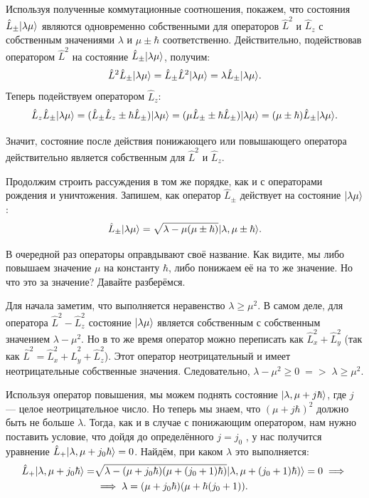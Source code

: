 Используя полученные коммутационные соотношения, покажем, что состояния
$\hat{L}_{\pm}\lvert\lambda\mu\rangle$ являются одновременно собственными для
операторов $\hat{L}^2$ и $\hat{L}_z$ с собственным значениями $\lambda$ и $\mu
  \pm \hbar$ соответственно. Действительно, подействовав оператором $\hat{L}^2$
на состояние $\hat{L}_{\pm}\lvert\lambda\mu\rangle$, получим:
\[
  \hat{L}^2\hat{L}_{\pm}\lvert\lambda\mu\rangle = \hat{L}_{\pm}\hat{L}^2\lvert\lambda\mu\rangle = \lambda\hat{L}_{\pm}\lvert\lambda\mu\rangle.
\]
Теперь подействуем оператором $\hat{L}_z$:
\[
  \hat{L}_z\hat{L}_{\pm}\lvert\lambda\mu\rangle = (\hat{L}_{\pm}\hat{L}_z \pm \hbar\hat{L}_{\pm})\lvert\lambda\mu\rangle = (\mu\hat{L}_{\pm} \pm \hbar\hat{L}_{\pm})\lvert\lambda\mu\rangle = (\mu \pm \hbar)\hat{L}_{\pm}\lvert\lambda\mu\rangle.
\]

Значит, состояние после действия понижающего или повышающего оператора
действительно является собственным для $\hat{L}^2$ и $\hat{L}_z$.

Продолжим строить рассуждения в том же порядке, как и с операторами рождения и
уничтожения. Запишем, как оператор $\hat{L}_{\pm}$ действует на состояние
$\lvert\lambda\mu\rangle$:
\[
  \hat{L}_{\pm}\lvert\lambda\mu\rangle = \sqrt{\lambda - \mu(\mu \pm \hbar)}\lvert\lambda,\mu\pm\hbar\rangle.
\]

В очередной раз операторы оправдывают своё название. Как видите, мы либо
повышаем значение $\mu$ на константу $\hbar$, либо понижаем её на то же
значение. Но что это за значение? Давайте разберёмся.

Для начала заметим, что выполняется неравенство $\lambda \geq \mu^2$. В самом
деле, для оператора $\hat{L}^2 - \hat{L}^2_z$ состояние $\lvert\lambda\mu\rangle$
является собственным с собственным значением $\lambda - \mu^2$. Но в то же
время оператор можно переписать как $\hat{L}^2_x + \hat{L}^2_y$ (так как
$\hat{L}^2 = \hat{L}^2_x + \hat{L}^2_y + \hat{L}^2_z$). Этот оператор
неотрицательный и имеет неотрицательные собственные значения. Следовательно,
$\lambda - \mu^2 \geq 0\; => \; \lambda \geq \mu^2$.

Используя оператор повышения, мы можем поднять состояние $\lvert\lambda,\mu +
    j\hbar\rangle$, где $j$ --- целое неотрицательное число. Но теперь мы знаем, что
$(\mu + j\hbar)^2$ должно быть не больше $\lambda$. Тогда, как и в случае с
понижающим оператором, нам нужно поставить условие, что дойдя до определённого
$j = j_0$ , у нас получится уравнение $\hat{L}_+\lvert\lambda, \mu + j_0\hbar\rangle =
  0$. Найдём, при каком $\lambda$ это выполняется:
\begin{align*}
  \hat{L}_{+}\lvert\lambda,\mu + j_0\hbar\rangle = &\sqrt{\lambda - (\mu+j_0\hbar)(\mu + (j_0 + 1)\hbar)}\lvert\lambda,\mu +(j_0 + 1)\hbar)\rangle = 0 \implies \\
  & \implies  \lambda = (\mu + j_0\hbar)(\mu + \hbar(j_0 + 1)).
\end{align*}

